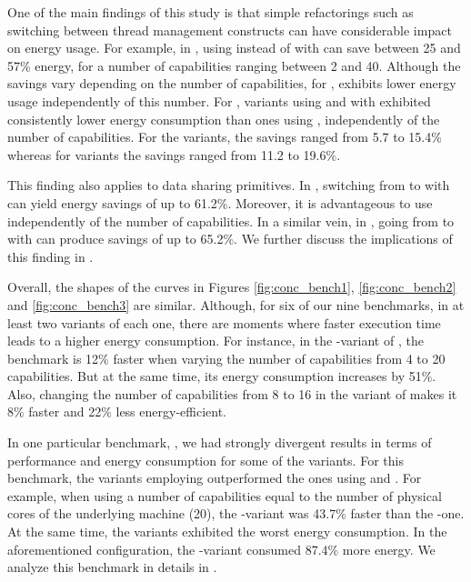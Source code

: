  One of the main findings of this study is that simple refactorings such as switching between thread management constructs can have considerable impact on energy usage. For example, in \spectral, using \forkOn instead of \forkOS with \TVar can save between 25 and 57\% energy, for a number of capabilities ranging between 2 and 40. Although the savings vary depending on the number of capabilities, for \spectral, \forkOn exhibits lower energy usage independently of this number. For \mandelbrot, variants using \forkOS and \forkOn with \MVar exhibited consistently lower energy consumption than ones using \forkIO, independently of the number of capabilities. For the \forkOS variants, the savings ranged from 5.7 to 15.4\% whereas for \forkOn variants the savings ranged from 11.2 to 19.6\%.

This finding also applies to data sharing primitives. In \chameneos, switching from \TMVar to \MVar with \forkOn can yield energy savings of up to 61.2\%. Moreover, it is advantageous to use \MVar independently of the number of capabilities. In a similar vein, in \fasta, going from \TVar to \MVar with \forkIO can produce savings of up to 65.2\%. We further discuss the implications of this finding in .
\newline

 Overall, the shapes of the curves in Figures \ref{fig:conc_bench1}, \ref{fig:conc_bench2} and \ref{fig:conc_bench3} are similar. Although, for six of our nine benchmarks, in at least two variants of each one, there are moments where faster execution time leads to a higher energy consumption. For instance, in the \forkOn-\TMVar variant of \regex, the benchmark is 12\% faster when varying the number of capabilities from 4 to 20 capabilities. But at the same time, its energy consumption increases by 51\%. Also, changing the number of capabilities from 8 to 16 in the \forkIO variant of \tsearch makes it 8\% faster and 22\% less energy-efficient.

In one particular benchmark, \fasta, we had strongly divergent results in terms of performance and energy consumption for some of the variants. For this benchmark, the variants  employing \TVar outperformed the ones using \TMVar and \MVar. For example, when using a number of capabilities equal to the number of physical cores of the underlying machine (20), the \forkOS-\TVar variant was 43.7\% faster than the \forkOS-\MVar one. At the same time, the \TVar variants exhibited the worst energy consumption. In the aforementioned configuration, the \forkOS-\TVar variant consumed 87.4\% more energy. We analyze this benchmark in details in .
\newline

